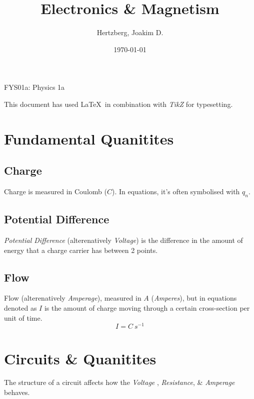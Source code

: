 \documentclass[12pt]{article}
\title{Electronics \& Magnetism}
\author{Hertzberg, Joakim D.}
\date{\today}
\begin{document}
\clearpage \maketitle
\begin{center}
	FYS01a: Physics 1a
\end{center}

\vfill

\begin{center}
This document has used \LaTeX\ in combination with \emph{TikZ} for typesetting.
\end{center}

\thispagestyle{empty}
\newpage

\tableofcontents

\newpage

\section{Fundamental Quanitites}


\subsection{Charge}
Charge is measured in Coulomb ($C$). In equations, it's 
often symbolised with $q_n$.


\subsection{Potential Difference}
\emph{Potential Difference} (alterenatively \emph{Voltage}) is the difference in the amount of energy that a charge carrier has between 2 points. 

\subsection{Flow}
Flow (alterenatively \emph{Amperage}), measured in 
$A$ (\emph{Amperes}), but in equations denoted as $I$ is 
the amount of charge moving through a certain 
cross-section per unit of time. $$I = C \ s^{-1}$$

\newpage

\section{Circuits \& Quanitites}
The structure of a circuit affects how the \emph{Voltage} 
, \emph{Resistance}, \& \emph{Amperage} behaves. 
\end{document}
